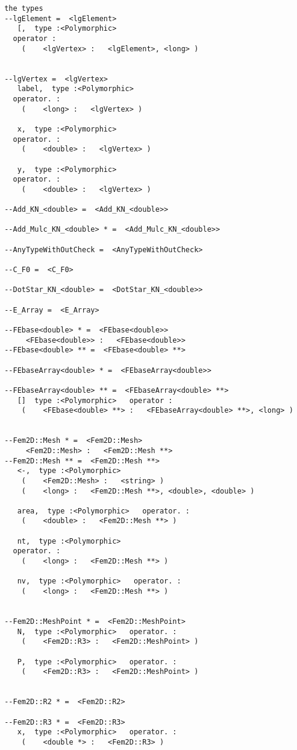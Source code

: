 \documentclass[twoside]{book}
\begin{document}
\begin{verbatim}
 the types 
 --lgElement =  <lgElement>
    [,  type :<Polymorphic>
   operator : 
	 (	  <lgVertex> :   <lgElement>, <long> )


 --lgVertex =  <lgVertex>
    label,  type :<Polymorphic>
   operator. : 
	 (	  <long> :   <lgVertex> )

    x,  type :<Polymorphic>
   operator. : 
	 (	  <double> :   <lgVertex> )

    y,  type :<Polymorphic>
   operator. : 
	 (	  <double> :   <lgVertex> )

 --Add_KN_<double> =  <Add_KN_<double>>

 --Add_Mulc_KN_<double> * =  <Add_Mulc_KN_<double>>

 --AnyTypeWithOutCheck =  <AnyTypeWithOutCheck>

 --C_F0 =  <C_F0>

 --DotStar_KN_<double> =  <DotStar_KN_<double>>

 --E_Array =  <E_Array>

 --FEbase<double> * =  <FEbase<double>>
	  <FEbase<double>> :   <FEbase<double>> 
 --FEbase<double> ** =  <FEbase<double> **>

 --FEbaseArray<double> * =  <FEbaseArray<double>>

 --FEbaseArray<double> ** =  <FEbaseArray<double> **>
    []  type :<Polymorphic>   operator : 
	 (	  <FEbase<double> **> :   <FEbaseArray<double> **>, <long> )


 --Fem2D::Mesh * =  <Fem2D::Mesh>
	  <Fem2D::Mesh> :   <Fem2D::Mesh **> 
 --Fem2D::Mesh ** =  <Fem2D::Mesh **>
    <-,  type :<Polymorphic>
 	 (	  <Fem2D::Mesh> :   <string> )
	 (	  <long> :   <Fem2D::Mesh **>, <double>, <double> )

    area,  type :<Polymorphic>   operator. : 
	 (	  <double> :   <Fem2D::Mesh **> )

    nt,  type :<Polymorphic>
   operator. : 
	 (	  <long> :   <Fem2D::Mesh **> )

    nv,  type :<Polymorphic>   operator. : 
	 (	  <long> :   <Fem2D::Mesh **> )


 --Fem2D::MeshPoint * =  <Fem2D::MeshPoint>
    N,  type :<Polymorphic>   operator. : 
	 (	  <Fem2D::R3> :   <Fem2D::MeshPoint> )

    P,  type :<Polymorphic>   operator. : 
	 (	  <Fem2D::R3> :   <Fem2D::MeshPoint> )


 --Fem2D::R2 * =  <Fem2D::R2>

 --Fem2D::R3 * =  <Fem2D::R3>
    x,  type :<Polymorphic>   operator. : 
	 (	  <double *> :   <Fem2D::R3> )


\end{verbatim}
\end{document}

